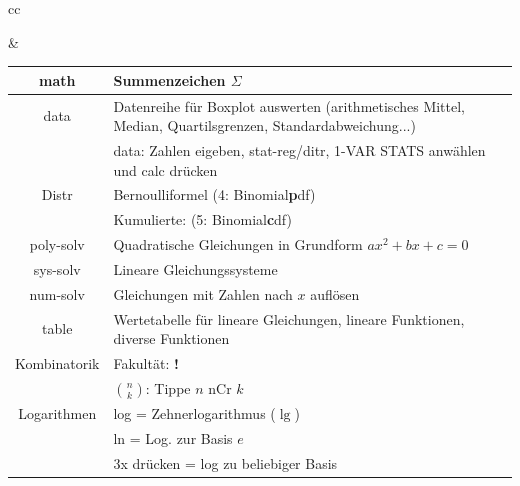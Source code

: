 \begin{tabular}{cc}


&

\begin{tabular}{c|p{90mm}}\hline
\cellcolor[HTML]{8888ee}math         & \cellcolor[HTML]{8888ee} Summenzeichen $\Sigma$ \\\hline
\cellcolor[HTML]{88ee88}data         & \cellcolor[HTML]{88ee88} Datenreihe für Boxplot auswerten (arithmetisches Mittel, Median, Quartilsgrenzen, Standardabweichung...)\\
\cellcolor[HTML]{88ee88}             & \cellcolor[HTML]{88ee88} data: Zahlen eigeben, stat-reg/ditr, 1-VAR STATS anwählen und calc drücken\\
\cellcolor[HTML]{88ee88}Distr        & \cellcolor[HTML]{88ee88} Bernoulliformel (4: Binomial\textbf{p}df)\\
\cellcolor[HTML]{88ee88}             & \cellcolor[HTML]{88ee88} Kumulierte: (5: Binomial\textbf{c}df)\\\hline
\cellcolor[HTML]{eeee88}poly-solv    & \cellcolor[HTML]{eeee88} Quadratische Gleichungen in Grundform $ax^2+bx+c=0$\\\hline
\cellcolor[HTML]{eebb88}sys-solv     & \cellcolor[HTML]{eebb88} Lineare Gleichungssysteme\\\hline
\cellcolor[HTML]{cccccc}num-solv     & \cellcolor[HTML]{cccccc} Gleichungen mit Zahlen nach $x$ auf\/lösen\\\hline
\cellcolor[HTML]{bb88ff}table        & \cellcolor[HTML]{bb88ff} Wertetabelle für lineare Gleichungen, lineare Funktionen, diverse Funktionen\\\hline
\cellcolor[HTML]{ddaa88}Kombinatorik & \cellcolor[HTML]{ddaa88} Fakultät: {\color{red}\textbf{!}}\\
\cellcolor[HTML]{ddaa88}             & \cellcolor[HTML]{ddaa88} $n \choose k$: Tippe $n$ nCr $k$\\\hline
\cellcolor[HTML]{bbaa88}Logarithmen  & \cellcolor[HTML]{bbaa88} log = Zehnerlogarithmus ($\lg$)\\
\cellcolor[HTML]{bbaa88}             & \cellcolor[HTML]{bbaa88} ln  = Log. zur Basis $e$\\
\cellcolor[HTML]{bbaa88}             & \cellcolor[HTML]{bbaa88} 3x drücken = log zu beliebiger Basis\\\hline
\end{tabular}\\
\end{tabular}


